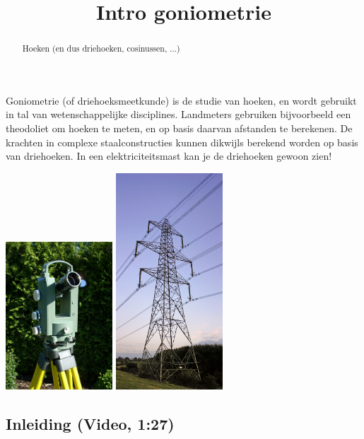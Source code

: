 \documentclass{ximera}
\title[Goniometrie:]{Intro goniometrie}
\begin{document}
\begin{abstract}
	Hoeken (en dus driehoeken, cosinussen, ...)
\end{abstract}
\maketitle


Goniometrie (of driehoeksmeetkunde) is de studie van hoeken, en wordt gebruikt in tal van wetenschappelijke disciplines. Landmeters gebruiken bijvoorbeeld een theodoliet om hoeken te meten, en op basis daarvan afstanden te berekenen. De krachten in complexe staalconstructies  kunnen dikwijls berekend worden op basis van driehoeken. In een elektriciteitsmast kan je de driehoeken gewoon zien!

\begin{center}
\begin{image}
	\includegraphics[width=0.3\textwidth]{Askania_Sekunden-Theodolit_TU_e_400.jpg}\quad
	\includegraphics[width=0.3\textwidth]{Pylon_ds.jpg}
\end{image}
\end{center}


\subsection{Inleiding (Video, 1:27)}
\begin{expandable}
 \begin{center}
 \end{center}
\end{expandable}
\end{document}
